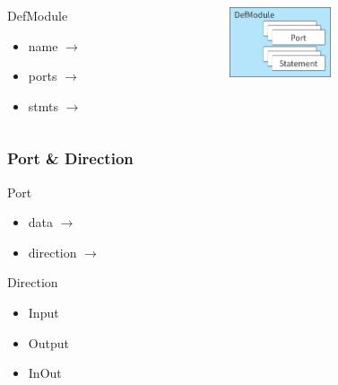 \begin{frame}
\begin{columns}
\begin{column}{0.5\textwidth}
      \begin{block}{DefModule}
        \begin{itemize}
          \item name  \(\rightarrow\) 
          \item ports \(\rightarrow\) 
	  \item stmts \(\rightarrow\) 
        \end{itemize}
      \end{block}
    \end{column}
    \begin{column}{0.5\textwidth}
      \includegraphics[width=3cm]{./fig/ir/defmodule.png}
    \end{column}
  \end{columns}

\end{frame}

\begin{frame}
  \frametitle{Port \& Direction}

  \begin{block}{Port}
    \begin{itemize}
      \item data      \(\rightarrow\) 
      \item direction \(\rightarrow\) 
    \end{itemize}
  \end{block}

  \begin{block}{Direction}
    \begin{itemize}
      \item {Input}
      \item {Output}
      \item {InOut}
    \end{itemize}

  \end{block}

\end{frame}

